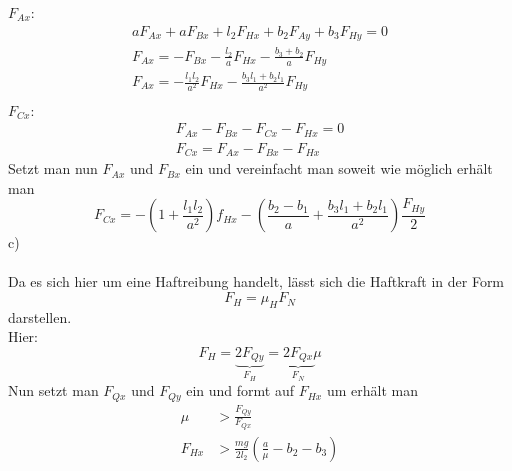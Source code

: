 $F_{Ax}$:
\begin{align*}
	aF_{Ax} + aF_{Bx} + l_2F_{Hx} + b_2F_{Ay} + b_3F_{Hy} = 0 \\
	F_{Ax} = - F_{Bx} - \frac{l_2}{a}F_{Hx} - \frac{b_3 + b_2}{a}F_{Hy} \\
	F_{Ax} = -\frac{l_1l_2}{a^2}F_{Hx} - \frac{b_3l_1 + b_2l_1}{a^2}F_{Hy} \\
\end{align*}
$F_{Cx}$:
\begin{align*}
	F_{Ax} - F_{Bx} - F_{Cx} - F_{Hx} = 0 \\
	F_{Cx} = F_{Ax} - F_{Bx} - F_{Hx} 
\end{align*}
Setzt man nun $F_{Ax}$ und $F_{Bx}$ ein und vereinfacht man soweit wie möglich erhält man
\[
	F_{Cx} = -\left(1 + \frac{l_1l_2}{a^2}\right)f_{Hx} - \left(\frac{b_2 - b_1}{a} + \frac{b_3l_1 + b_2l_1}{a^2}\right)\frac{F_{Hy}}{2}
\]
\newpage
\noindent
c) \\ \\
Da es sich hier um eine Haftreibung handelt, lässt sich die Haftkraft in der Form
\[
	F_H = \mu_H F_N
\]
darstellen. \\
Hier:
\[
	F_H = \underbrace{2F_{Qy}}_{F_H}  = \underbrace{2F_{Qx}}_{F_N}\mu
\]
Nun setzt man $F_{Qx}$ und $F_{Qy}$ ein und formt auf $F_{Hx}$ um erhält man
\begin{align*}
	\mu &> \frac{F_{Qy}}{F_{Qx}} \\
	F_{Hx} &> \frac{mg}{2l_2}\left(\frac{a}{\mu} - b_2 - b_3\right)
\end{align*}